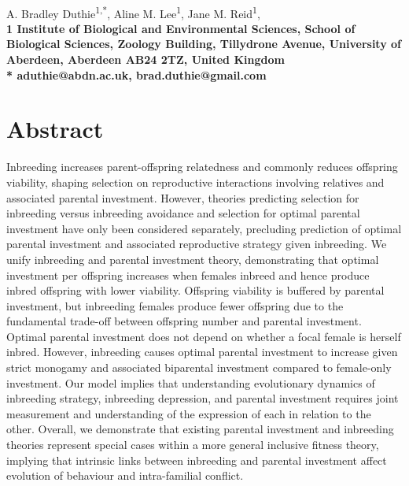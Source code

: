 \documentclass[10pt,letterpaper]{article}
\begin{document}
\vspace*{0.35in}

\begin{flushleft}
{\LARGE
\textbf{}
}
\newline
\\
A. Bradley Duthie\textsuperscript{1,*},
Aline M. Lee\textsuperscript{1},
Jane M. Reid\textsuperscript{1},
\\
\bigskip
\bf{1} Institute of Biological and Environmental Sciences, School of Biological Sciences, Zoology Building, Tillydrone Avenue, University of Aberdeen, Aberdeen AB24 2TZ, United Kingdom
\\
\bigskip
*  aduthie@abdn.ac.uk, brad.duthie@gmail.com

\end{flushleft}

\section*{Abstract}
Inbreeding increases parent-offspring relatedness and commonly reduces offspring viability, shaping selection on reproductive interactions involving relatives and associated parental investment. However, theories predicting selection for inbreeding versus inbreeding avoidance and selection for optimal parental investment have only been considered separately, precluding prediction of optimal parental investment and associated reproductive strategy given inbreeding. We unify inbreeding and parental investment theory, demonstrating that optimal investment per offspring increases when females inbreed and hence produce inbred offspring with lower viability. Offspring viability is buffered by parental investment, but inbreeding females produce fewer offspring due to the fundamental trade-off between offspring number and parental investment. Optimal parental investment does not depend on whether a focal female is herself inbred. However, inbreeding causes optimal parental investment to increase given strict monogamy and associated biparental investment compared to female-only investment. Our model implies that understanding evolutionary dynamics of inbreeding strategy, inbreeding depression, and parental investment requires joint measurement and understanding of the expression of each in relation to the other. Overall, we demonstrate that existing parental investment and inbreeding theories represent special cases within a more general inclusive fitness theory, implying that intrinsic links between inbreeding and parental investment affect evolution of behaviour and intra-familial conflict.
\end{document}
